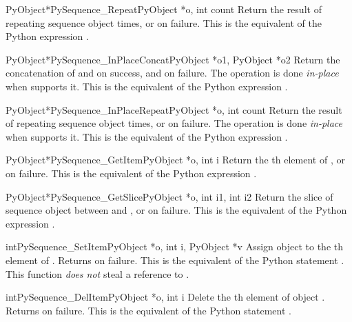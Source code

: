 \begin{cfuncdesc}{PyObject*}{PySequence_Repeat}{PyObject *o, int count}
  Return the result of repeating sequence object  
  times, or \NULL{} on failure.  This is the equivalent of the Python
  expression .
\end{cfuncdesc}

\begin{cfuncdesc}{PyObject*}{PySequence_InPlaceConcat}{PyObject *o1,
                                                       PyObject *o2}
  Return the concatenation of  and  on success, and
  \NULL{} on failure.  The operation is done \emph{in-place} when
   supports it.  This is the equivalent of the Python
  expression .
\end{cfuncdesc}


\begin{cfuncdesc}{PyObject*}{PySequence_InPlaceRepeat}{PyObject *o, int count}
  Return the result of repeating sequence object  
  times, or \NULL{} on failure.  The operation is done \emph{in-place}
  when  supports it.  This is the equivalent of the Python
  expression .
\end{cfuncdesc}


\begin{cfuncdesc}{PyObject*}{PySequence_GetItem}{PyObject *o, int i}
  Return the th element of , or \NULL{} on failure.
  This is the equivalent of the Python expression
  .
\end{cfuncdesc}


\begin{cfuncdesc}{PyObject*}{PySequence_GetSlice}{PyObject *o, int i1, int i2}
  Return the slice of sequence object  between  and
  , or \NULL{} on failure. This is the equivalent of the
  Python expression .
\end{cfuncdesc}


\begin{cfuncdesc}{int}{PySequence_SetItem}{PyObject *o, int i, PyObject *v}
  Assign object  to the th element of .  Returns
   on failure.  This is the equivalent of the Python
  statement .  This function \emph{does not}
  steal a reference to .
\end{cfuncdesc}

\begin{cfuncdesc}{int}{PySequence_DelItem}{PyObject *o, int i}
  Delete the th element of object .  Returns 
  on failure.  This is the equivalent of the Python statement
  .
\end{cfuncdesc}

